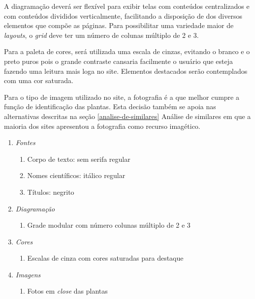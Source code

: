 A diagramação deverá ser flexível para exibir telas com conteúdos centralizados e com conteúdos divididos verticalmente, facilitando a disposição de dos diversos elementos que compõe as páginas. Para possibilitar uma variedade maior de \emph{layouts}, o \emph{grid} deve ter um número de colunas múltiplo de 2 e 3.

Para a paleta de cores, será utilizada uma escala de cinzas, evitando o branco e o preto puros pois o grande contraste cansaria facilmente o usuário que esteja fazendo uma leitura mais loga no site. Elementos destacados serão contemplados com uma cor saturada.

Para o tipo de imagem utilizado no site, a fotografia é a que melhor cumpre a função de identificação das plantas. Esta decisão também se apoia nas alternativas descritas na seção \ref{analise-de-similares} Análise de similares em que a maioria dos sites apresentou a fotografia como recurso imagético.

\begin{enumerate}
\def\labelenumi{\arabic{enumi}.}
\tightlist
\item
  \emph{Fontes}

  \begin{enumerate}
  \def\labelenumii{\arabic{enumii}.}
  \tightlist
  \item
    Corpo de texto: sem serifa regular
  \item
    Nomes científicos: itálico regular
  \item
    Títulos: negrito
  \end{enumerate}
\item
  \emph{Diagramação}

  \begin{enumerate}
  \def\labelenumii{\arabic{enumii}.}
  \tightlist
  \item
    Grade modular com número colunas múltiplo de 2 e 3
  \end{enumerate}
\item
  \emph{Cores}

  \begin{enumerate}
  \def\labelenumii{\arabic{enumii}.}
  \tightlist
  \item
    Escalas de cinza com cores saturadas para destaque
  \end{enumerate}
\item
  \emph{Imagens}

  \begin{enumerate}
  \def\labelenumii{\arabic{enumii}.}
  \tightlist
  \item
    Fotos em \emph{close} das plantas
  \end{enumerate}
\end{enumerate}

